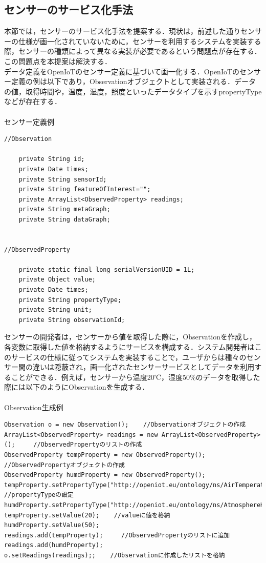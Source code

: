 \documentclass{kuisthesis}			%
\begin{document}
\subsection{センサーのサービス化手法}
本節では，センサーのサービス化手法を提案する．現状は，前述した通りセンサーの仕様が画一化されていないために，センサーを利用するシステムを実装する際，センサーの種類によって異なる実装が必要であるという問題点が存在する．この問題点を本提案は解決する．
\\
データ定義をOpenIoTのセンサー定義に基づいて画一化する．OpenIoTのセンサー定義の例は以下であり，Observationオブジェクトとして実装される．データの値，取得時間や，温度，湿度，照度といったデータタイプを示すpropertyTypeなどが存在する．\\
\\
センサー定義例
\begin{lstlisting}
//Observation

	private String id;	
	private Date times;	
	private String sensorId;
	private String featureOfInterest=""; 
	private ArrayList<ObservedProperty> readings;
	private String metaGraph;
	private String dataGraph;
	
	
//ObservedProperty

	private static final long serialVersionUID = 1L;
	private Object value;
	private Date times;
	private String propertyType;
	private String unit;
	private String observationId;
\end{lstlisting}

センサーの開発者は，センサーから値を取得した際に，Observationを作成し，各変数に取得した値を格納するようにサービスを構成する．システム開発者はこのサービスの仕様に従ってシステムを実装することで，ユーザからは種々のセンサー間の違いは隠蔽され，画一化されたセンサーサービスとしてデータを利用することができる．例えば，センサーから温度20℃，湿度50\%のデータを取得した際には以下のようにObservationを生成する．\\
\\
Observation生成例
\begin{lstlisting}
Observation o = new Observation();    //Observationオブジェクトの作成
ArrayList<ObservedProperty> readings = new ArrayList<ObservedProperty>();     //ObservedPropertyのリストの作成
ObservedProperty tempProperty = new ObservedProperty();    //ObservedPropertyオブジェクトの作成
ObservedProperty humdProperty = new ObservedProperty();    
tempProperty.setPropertyType("http://openiot.eu/ontology/ns/AirTemperature");    　//propertyTypeの設定
humdProperty.setPropertyType("http://openiot.eu/ontology/ns/AtmosphereHumidity");
tempProperty.setValue(20);    //valueに値を格納
humdProperty.setValue(50);
readings.add(tempProperty);     //ObservedPropertyのリストに追加
readings.add(humdProperty);
o.setReadings(readings);;    //Observationに作成したリストを格納
\end{lstlisting}
\end{document}
